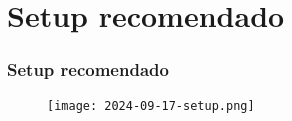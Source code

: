 \section{Setup recomendado}

\begin{frame}
\frametitle{Setup recomendado}

\begin{figure}[h]
    \begin{flushleft}
        \texttt{[image: 2024-09-17-setup.png]}
        \label{fig:setup}
    \end{flushleft}
\end{figure}

\end{frame}
